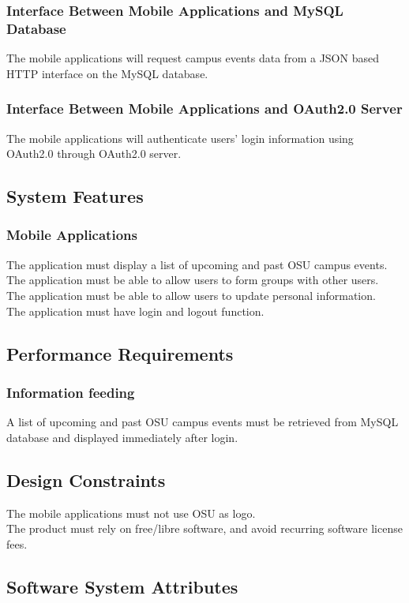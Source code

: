 \documentclass[letterpaper, 10pt,titlepage]{article}
\begin{document}
\subsubsection{Interface Between Mobile Applications and MySQL Database}
The mobile applications will request campus events data from a JSON based HTTP interface on the MySQL database.

\subsubsection{Interface Between Mobile Applications and OAuth2.0 Server}
The mobile applications will authenticate users' login information using OAuth2.0 through OAuth2.0 server.


\subsection{System Features}
\subsubsection{Mobile Applications}
The application must display a list of upcoming and past OSU campus events.\\
The application must be able to allow users to form groups with other users.\\
The application must be able to allow users to update personal information.\\
The application must have login and logout function.

\subsection{Performance Requirements}
\subsubsection{Information feeding}
A list of upcoming and past OSU campus events must be retrieved from MySQL database and displayed immediately after login.

\subsection{Design Constraints}
The mobile applications must not use OSU as logo.\\
The product must rely on free/libre software, and avoid recurring software license fees.

\subsection{Software System Attributes}
\end{document}
